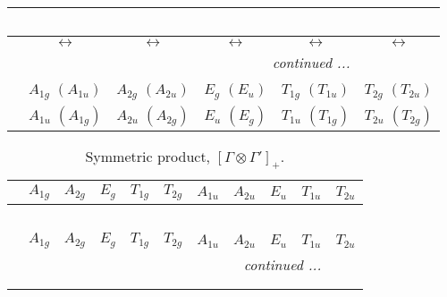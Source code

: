\documentclass[fleqn,10pt,landscape]{article}
\begin{document}
\begin{itemize}
\begin{center}
\begin{longtable}{cccccc}
\multicolumn{5}{l}{\tablename\ \thetable{}} \\
 \hline \hline
 & $\leftrightarrow$ & $\leftrightarrow$ & $\leftrightarrow$ & $\leftrightarrow$ & $\leftrightarrow$ \\ \hline \endhead

 \hline \hline
\multicolumn{5}{r}{\footnotesize\it continued ...} \\ \endfoot

 \hline \hline
\multicolumn{5}{r}{} \\ \endlastfoot

 & $ A_{1g}\,\,(A_{1u}) $ & $ A_{2g}\,\,(A_{2u}) $ & $ E_{g}\,\,(E_{u}) $ & $ T_{1g}\,\,(T_{1u}) $ & $ T_{2g}\,\,(T_{2u}) $ \\
& $ A_{1u}\,\,(A_{1g}) $ & $ A_{2u}\,\,(A_{2g}) $ & $ E_{u}\,\,(E_{g}) $ & $ T_{1u}\,\,(T_{1g}) $ & $ T_{2u}\,\,(T_{2g}) $ \\
\end{longtable}
\end{center}
\begin{center}
\renewcommand{\arraystretch}{1.0}
\begin{longtable}{c|cccccccccc}
\caption{Symmetric product, $[\Gamma\otimes\Gamma']_+.$}
 \\
 \hline \hline
 & $ A_{1g} $ & $ A_{2g} $ & $ E_{g} $ & $ T_{1g} $ & $ T_{2g} $ & $ A_{1u} $ & $ A_{2u} $ & $ E_{u} $ & $ T_{1u} $ & $ T_{2u} $ \\ \hline \endfirsthead

\multicolumn{10}{l}{\tablename\ \thetable{}} \\
 \hline \hline
 & $ A_{1g} $ & $ A_{2g} $ & $ E_{g} $ & $ T_{1g} $ & $ T_{2g} $ & $ A_{1u} $ & $ A_{2u} $ & $ E_{u} $ & $ T_{1u} $ & $ T_{2u} $ \\ \hline \endhead

 \hline \hline
\multicolumn{10}{r}{\footnotesize\it continued ...} \\ \endfoot

 \hline \hline
\multicolumn{10}{r}{} \\ \endlastfoot


\end{longtable}
\end{center}
\end{itemize}
\end{document}
